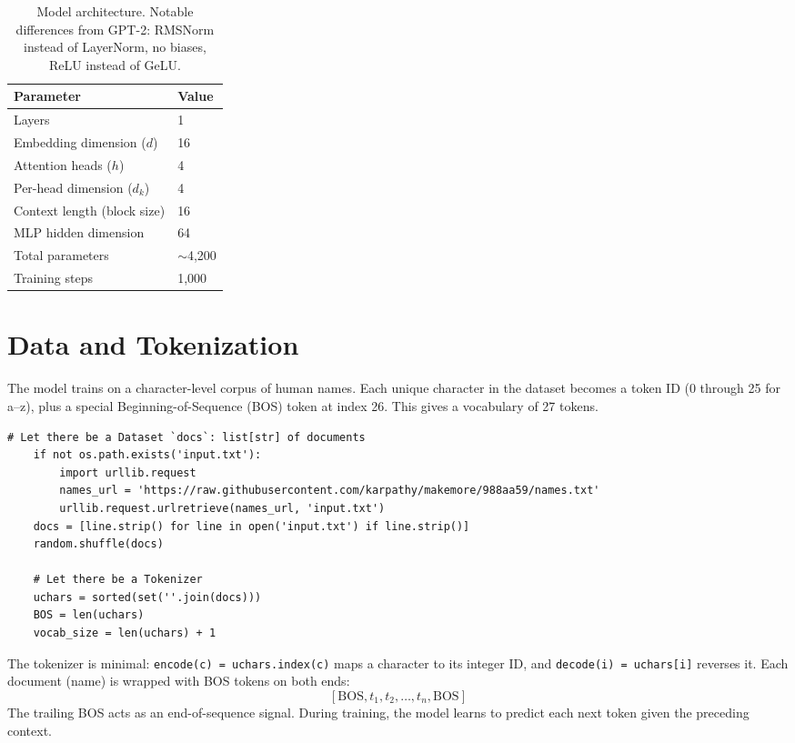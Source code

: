 \documentclass[11pt,a4paper]{article}
\begin{document}
\begin{table}[h]
\centering
\begin{tabular}{ll}
\toprule
\textbf{Parameter} & \textbf{Value} \\
\midrule
Layers & 1 \\
Embedding dimension ($d$) & 16 \\
Attention heads ($h$) & 4 \\
Per-head dimension ($d_k$) & 4 \\
Context length (block size) & 16 \\
MLP hidden dimension & 64 \\
Total parameters & $\sim$4{,}200 \\
Training steps & 1{,}000 \\
\bottomrule
\end{tabular}
\caption{Model architecture. Notable differences from GPT-2: RMSNorm instead of LayerNorm, no biases, ReLU instead of GeLU.}
\end{table}

\section{Data and Tokenization}

The model trains on a character-level corpus of human names. Each unique character in the dataset becomes a token ID (0 through 25 for a--z), plus a special Beginning-of-Sequence (BOS) token at index 26. This gives a vocabulary of 27 tokens.

\begin{lstlisting}[firstnumber=65]
    # Let there be a Dataset `docs`: list[str] of documents
    if not os.path.exists('input.txt'):
        import urllib.request
        names_url = 'https://raw.githubusercontent.com/karpathy/makemore/988aa59/names.txt'
        urllib.request.urlretrieve(names_url, 'input.txt')
    docs = [line.strip() for line in open('input.txt') if line.strip()]
    random.shuffle(docs)

    # Let there be a Tokenizer
    uchars = sorted(set(''.join(docs)))
    BOS = len(uchars)
    vocab_size = len(uchars) + 1
\end{lstlisting}

The tokenizer is minimal: \texttt{encode(c) = uchars.index(c)} maps a character to its integer ID, and \texttt{decode(i) = uchars[i]} reverses it. Each document (name) is wrapped with BOS tokens on both ends:
\[
[\text{BOS}, t_1, t_2, \ldots, t_n, \text{BOS}]
\]
The trailing BOS acts as an end-of-sequence signal. During training, the model learns to predict each next token given the preceding context.
\end{document}
